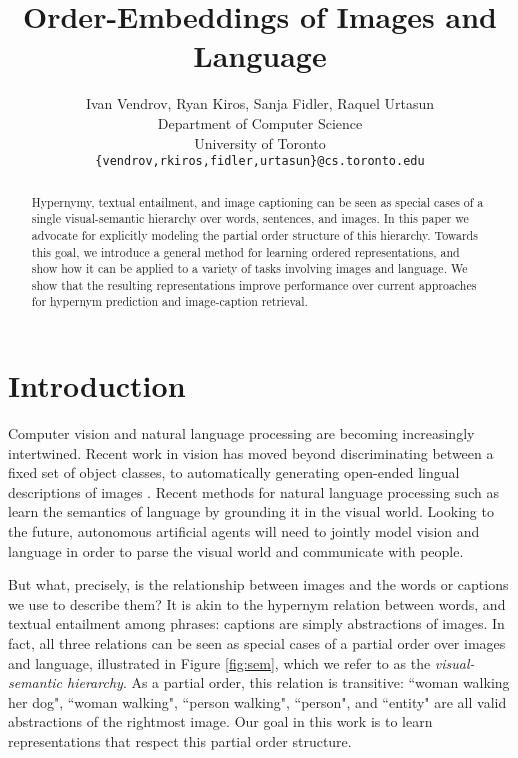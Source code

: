 \documentclass{article} \usepackage{iclr2016_conference,times}
\title{Order-Embeddings of Images and Language}
\author{Ivan Vendrov, Ryan Kiros, Sanja Fidler, Raquel Urtasun \\
Department of Computer Science\\
University of Toronto\\
\texttt{\{vendrov,rkiros,fidler,urtasun\}@cs.toronto.edu} \\}
\begin{document}
\maketitle

\begin{abstract}


Hypernymy, textual entailment, and image captioning can be seen as special cases of a single visual-semantic hierarchy over words, sentences, and images. In this paper we advocate for explicitly modeling the partial order structure of this hierarchy. Towards this goal, we introduce a general method for learning ordered representations, and show how it can be applied to a variety of tasks involving images and language. We show that the resulting representations improve performance over current approaches for hypernym prediction and image-caption retrieval.


 \end{abstract}

\vspace{-2mm}
\section{Introduction}
\vspace{-1mm}



Computer vision and natural language processing are becoming increasingly intertwined. Recent work in vision has moved beyond discriminating between a fixed set of object classes, to automatically generating open-ended lingual descriptions of images \citep{vinyals2015show}. Recent methods for natural language processing such as \citet{flickr30k} learn the semantics of language by grounding it in the visual world. Looking to the future, autonomous artificial agents will need to jointly model vision and language in order to parse the visual world and communicate with people.


But what, precisely, is the relationship between images and the words or captions we use to describe them? It is akin to the hypernym relation between words, and textual entailment among phrases: captions are simply abstractions of images. In fact, all three relations can be seen as special cases of a partial order over images and language, illustrated in Figure \ref{fig:sem}, which we refer to as the \emph{visual-semantic hierarchy}. As a partial order, this relation is transitive: ``woman walking her dog", ``woman walking", ``person walking", ``person", and ``entity" are all valid abstractions of the rightmost image. Our goal in this work is to learn  representations that respect this partial order structure.
\end{document}
